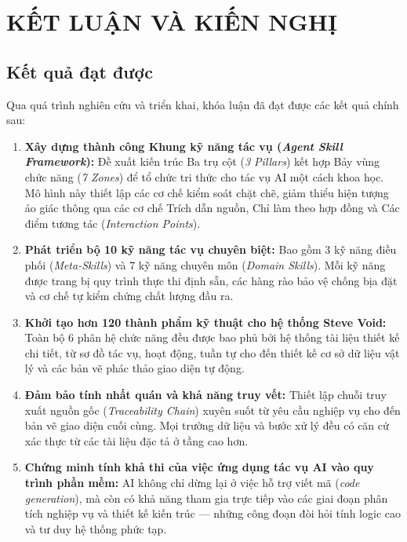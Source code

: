 \documentclass[13pt,a4paper,oneside]{extreport}
\numberwithin{equation}{chapter}
\numberwithin{figure}{chapter}
\numberwithin{table}{chapter}
\begin{document}
\chapter*{KẾT LUẬN VÀ KIẾN NGHỊ}

\section*{Kết quả đạt được}

Qua quá trình nghiên cứu và triển khai, khóa luận đã đạt được các kết quả chính sau:

\begin{enumerate}
    \item \textbf{Xây dựng thành công Khung kỹ năng tác vụ (\textit{Agent Skill Framework}):} Đề xuất kiến trúc Ba trụ cột (\textit{3 Pillars}) kết hợp Bảy vùng chức năng (\textit{7 Zones}) để tổ chức tri thức cho tác vụ AI một cách khoa học. Mô hình này thiết lập các cơ chế kiểm soát chặt chẽ, giảm thiểu hiện tượng ảo giác thông qua các cơ chế Trích dẫn nguồn, Chỉ làm theo hợp đồng và Các điểm tương tác (\textit{Interaction Points}).

    \item \textbf{Phát triển bộ 10 kỹ năng tác vụ chuyên biệt:} Bao gồm 3 kỹ năng điều phối (\textit{Meta-Skills}) và 7 kỹ năng chuyên môn (\textit{Domain Skills}). Mỗi kỹ năng được trang bị quy trình thực thi định sẵn, các hàng rào bảo vệ chống bịa đặt và cơ chế tự kiểm chứng chất lượng đầu ra.

    \item \textbf{Khởi tạo hơn 120 thành phẩm kỹ thuật cho hệ thống Steve Void:} Toàn bộ 6 phân hệ chức năng đều được bao phủ bởi hệ thống tài liệu thiết kế chi tiết, từ sơ đồ tác vụ, hoạt động, tuần tự cho đến thiết kế cơ sở dữ liệu vật lý và các bản vẽ phác thảo giao diện tự động.

    \item \textbf{Đảm bảo tính nhất quán và khả năng truy vết:} Thiết lập chuỗi truy xuất nguồn gốc (\textit{Traceability Chain}) xuyên suốt từ yêu cầu nghiệp vụ cho đến bản vẽ giao diện cuối cùng. Mọi trường dữ liệu và bước xử lý đều có căn cứ xác thực từ các tài liệu đặc tả ở tầng cao hơn.

    \item \textbf{Chứng minh tính khả thi của việc ứng dụng tác vụ AI vào quy trình phần mềm:} AI không chỉ dừng lại ở việc hỗ trợ viết mã (\textit{code generation}), mà còn có khả năng tham gia trực tiếp vào các giai đoạn phân tích nghiệp vụ và thiết kế kiến trúc — những công đoạn đòi hỏi tính logic cao và tư duy hệ thống phức tạp.
\end{enumerate}
\end{document}

